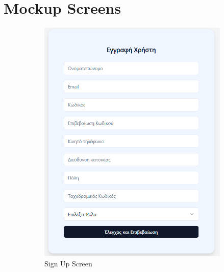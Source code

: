 \documentclass[12pt,a4paper,twoside]{book}
\begin{document}

\section{Mockup Screens}

\begin{figure}[H]
    \centering
    \begin{subfigure}[b]{0.48\textwidth}
        \centering
        \includegraphics[width=\textwidth]{Mockup Screens/mockup-register.png}
        \caption{Sign Up Screen}\label{fig:mockup1}
    \end{subfigure}
    \hfill
    \begin{subfigure}[b]{0.48\textwidth}

\end{subfigure}
\end{figure}
\end{document}

